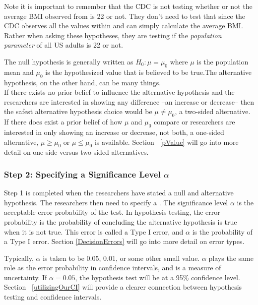 Note it is important to remember that the CDC is not testing whether or not the average BMI observed from  is 22 or not. They don't need to test that since the CDC observes all the values within  and can simply calculate the average BMI. Rather when asking these hypotheses, they are testing if the \emph{population parameter} of all US adults is 22 or not. 

\begin{tipBox}{
The null hypothesis is generally written as $H_0: \mu=\mu_0$ where $\mu$ is the population mean and $\mu_0$ is the hypothesized value that is believed to be true.The alternative hypothesis, on the other hand, can be many things.\\ 

If there exists no prior belief to influence the alternative hypothesis and the researchers are interested in showing any difference --an increase or decrease-- then the safest alternative hypothesis choice would be $\mu\neq \mu_0$, a two-sided alternative. If there does exist a prior belief of how $\mu$ and $\mu_0$ compare or researchers are interested in only showing an increase or decrease, not both, a one-sided alternative, $\mu\geq \mu_0$ or $\mu \leq \mu_0$ is available. Section ~\ref{pValue} will go into more detail on one-side versus two sided alternatives.}
\end{tipBox}

\subsubsection{Step 2: Specifying a Significance Level $\alpha$}
Step 1 is completed when the researchers have stated a null and alternative hypothesis. The researchers then need to specify a . The significance level $\alpha$ is the acceptable error probability of the test. In hypothesis testing, the error probability is the probability of concluding the alternative hypothesis is true when it is not true. This error is called a Type I error, and $\alpha$ is the probability of a Type I error. Section \ref{DecisionErrors} will go into more detail on error types. 

Typically, $\alpha$ is taken to be 0.05, 0.01, or some other small value. $\alpha$ plays the same role as the error probability in confidence intervals, and is a measure of uncertainty. If $\alpha=0.05$, the hypothesis test will be at a 95\% confidence level. Section ~\ref{utilizingOurCI} will provide a clearer connection between hypothesis testing and confidence intervals.  

